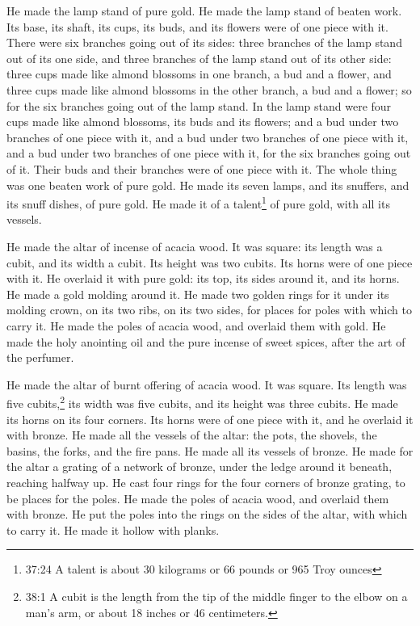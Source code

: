 \myverse{}He made the lamp stand of pure gold. He made the lamp stand
of beaten work. Its base, its shaft, its cups, its buds, and its flowers were of one piece with it.
\myverse{}There were six branches going out of its sides: three branches of the lamp
stand out of its one side, and three branches of the lamp stand out of its other side:
\myverse{}three cups made like almond blossoms in one branch, a bud and a flower, and
three cups made like almond blossoms in the other branch, a bud and a flower; so for the six branches
going out of the lamp stand.
\myverse{}In the lamp stand were four cups made like almond blossoms, its buds and
its flowers;
\myverse{}and a bud under two branches of one piece with it, and a bud under two branches
of one piece with it, and a bud under two branches of one piece with it, for the six branches going out
of it.
\myverse{}Their buds and their branches were of one piece with it. The whole thing
was one beaten work of pure gold.
\myverse{}He made its seven lamps, and its snuffers, and its snuff dishes, of pure
gold.
\myverse{}He made it of a talent\footnote{37:24 A talent is about 30 kilograms or 66 pounds or 965 Troy ounces} of pure gold, with all
its vessels.


\myverse{}He made the altar of incense of acacia wood. It was square:
its length was a cubit, and its width a cubit. Its height was two cubits. Its horns were of one piece
with it.
\myverse{}He overlaid it with pure gold: its top, its sides around it, and its horns.
He made a gold molding around it.
\myverse{}He made two golden rings for it under its molding crown, on its two ribs,
on its two sides, for places for poles with which to carry it.
\myverse{}He made the poles of acacia wood, and overlaid them with gold.
\myverse{}He made the holy anointing oil and the pure incense of sweet spices, after
the art of the perfumer.


\mychapter{} \myverse*{}He made the altar of burnt offering of acacia wood. It was square.
Its length was five cubits,\footnote{38:1 A cubit is the length from the tip of the middle finger to the elbow on a man’s arm, or about
	18 inches or 46 centimeters.} its width was five cubits, and its height was three cubits.
\myverse{}He made its horns on its four corners. Its horns were of one piece with it,
and he overlaid it with bronze.
\myverse{}He made all the vessels of the altar: the pots, the shovels, the basins, the
forks, and the fire pans. He made all its vessels of bronze.
\myverse{}He made for the altar a grating of a network of bronze, under the ledge around
it beneath, reaching halfway up.
\myverse{}He cast four rings for the four corners of bronze grating, to be places for
the poles.
\myverse{}He made the poles of acacia wood, and overlaid them with bronze.
\myverse{}He put the poles into the rings on the sides of the altar, with which to carry
it. He made it hollow with planks.


